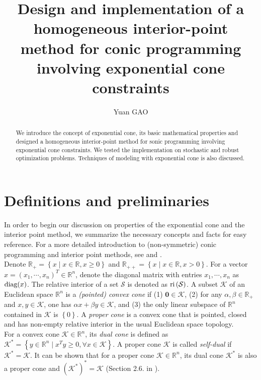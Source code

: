 \documentclass[10pt]{article}
\title{Design and implementation of a homogeneous interior-point method for conic programming involving exponential cone constraints}
\author{Yuan GAO}
\theoremstyle{definition}
\theoremstyle{plain}
\def\interior{\protect{\textnormal{ri}}}
\def\diagonal{\protect{\textnormal{diag}}}
\begin{document}
\maketitle

\begin{abstract}
We introduce the concept of exponential cone, its basic mathematical properties and designed a homogeneous interior-point method for sonic programming involving exponential cone constraints. We tested the implementation on stochastic and robust optimization problems. Techniques of modeling with exponential cone is also discussed.
\end{abstract}

\section{Definitions and preliminaries}
In order to begin our discussion on properties of the exponential cone and the interior point method, we summarize the necessary concepts and facts for easy reference. For a more detailed introduction to (non-symmetric) conic programming and interior point methods, see \cite{Robert_thesis} and \cite{Akle_thesis}.\\

Denote $\mathbb{R}_+ = \left\{x \mid x\in \mathbb{R}, x\geq 0\right\}$ and $\mathbb{R}_{++} = \left\{x \mid x\in \mathbb{R}, x> 0\right\}$. For a vector $x = (x_1, \cdots, x_n)^T \in \mathbb{R}^n$, denote the diagonal matrix with entries $x_1, \cdots, x_n$ as $\diagonal(x)$. The relative interior of a set $\mathcal{S}$ is denoted as $\interior\left(\mathcal{S}\right)$. A subset $\mathcal{K}$ of an Euclidean space $\mathbb{R}^n$ is a \textit{(pointed) convex cone} if (1) $\mathbf{0} \in \mathcal{K}$, (2) for any $\alpha, \beta \in \mathbb{R}_+$ and $x,y \in \mathcal{K}$, one has $\alpha x + \beta y \in \mathcal{K}$, and (3) the only linear subspace of $\mathbb{R}^n$ contained in $\mathcal{K}$ is $\left\{0\right\}$. A \textit{proper cone} is a convex cone that is pointed, closed and has non-empty relative interior in the usual Euclidean space topology.\\

For a convex cone $\mathcal{K} \in \mathbb{R}^n$, its \textit{dual cone} is defined as 
$\mathcal{K}^* = \left\{y\in \mathbb{R}^n \mid x^T y\geq 0, \forall x \in \mathcal{K} \right\}$. A proper cone $\mathcal{K}$ is called \textit{self-dual} if $\mathcal{K}^* = \mathcal{K}$. It can be shown that for a proper cone $\mathcal{K} \in \mathbb{R}^n$, its dual cone $\mathcal{K}^*$ is also a proper cone and $(\mathcal{K}^*)^* = \mathcal{K}$ (Section 2.6. in \cite{Boyd_Vander_Convex_Opt_Book}). \\
\end{document}
